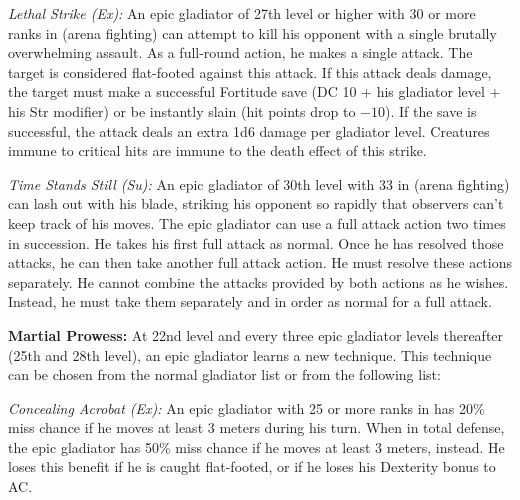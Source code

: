 \textit{Lethal Strike (Ex):}  An epic gladiator of 27th level or higher with 30 or more ranks in  (arena fighting) can attempt to kill his opponent with a single brutally overwhelming assault. As a full-round action, he makes a single attack. The target is considered flat-footed against this attack. If this attack deals damage, the target must make a successful Fortitude save (DC 10 + \onehalf his gladiator level + his Str modifier) or be instantly slain (hit points drop to $-10$). If the save is successful, the attack deals an extra 1d6 damage per gladiator level. Creatures immune to critical hits are immune to the death effect of this strike.

\textit{Time Stands Still (Su):} An epic gladiator of 30th level with 33 in  (arena fighting) can lash out with his blade, striking his opponent so rapidly that observers can't keep track of his moves. The epic gladiator can use a full attack action two times in succession. He takes his first full attack as normal. Once he has resolved those attacks, he can then take another full attack action. He must resolve these actions separately. He cannot combine the attacks provided by both actions as he wishes. Instead, he must take them separately and in order as normal for a full attack.

\textbf{Martial Prowess:} At 22nd level and every three epic gladiator levels thereafter (25th and 28th level), an epic gladiator learns a new technique. This technique can be chosen from the normal gladiator list or from the following list:

\textit{Concealing Acrobat (Ex):} An epic gladiator with 25 or more ranks in  has 20\% miss chance if he moves at least 3 meters during his turn. When in total defense, the epic gladiator has 50\% miss chance if he moves at least 3 meters, instead. He loses this benefit if he is caught flat-footed, or if he loses his Dexterity bonus to AC.




